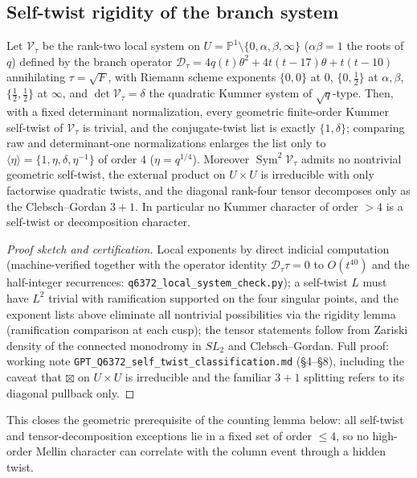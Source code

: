 \subsection{Self-twist rigidity of the branch system}

\begin{theorem}\label{thm:self-twist}
Let $\mathcal V_\tau$ be the rank-two local system on
$U=\mathbb P^1\setminus\{0,\alpha,\beta,\infty\}$ ($\alpha\beta=1$ the roots
of $q$) defined by the branch operator
$\mathcal D_\tau=4q(t)\theta^2+4t(t-17)\theta+t(t-10)$ annihilating
$\tau=\sqrt F$, with Riemann scheme exponents $\{0,0\}$ at $0$,
$\{0,\tfrac12\}$ at $\alpha,\beta$, $\{\tfrac12,\tfrac12\}$ at $\infty$, and
$\det\mathcal V_\tau=\delta$ the quadratic Kummer system of $\sqrt{q}$-type.
Then, with a fixed determinant normalization, every geometric finite-order
Kummer self-twist of $\mathcal V_\tau$ is trivial, and the conjugate-twist
list is exactly $\{1,\delta\}$; comparing raw and determinant-one
normalizations enlarges the list only to
$\langle\eta\rangle=\{1,\eta,\delta,\eta^{-1}\}$ of order $4$
($\eta=q^{1/4}$).  Moreover $\operatorname{Sym}^2\mathcal V_\tau$ admits no
nontrivial geometric self-twist, the external product on $U\times U$ is
irreducible with only factorwise quadratic twists, and the diagonal rank-four
tensor decomposes only as the Clebsch--Gordan $3+1$.  In particular no Kummer
character of order $>4$ is a self-twist or decomposition character.
\end{theorem}

\begin{proof}[Proof sketch and certification]
Local exponents by direct indicial computation (machine-verified together
with the operator identity $\mathcal D_\tau\tau=0$ to $O(t^{40})$ and the
half-integer recurrences: \texttt{q6372\_local\_system\_check.py}); a
self-twist $L$ must have $L^2$ trivial with ramification supported on the
four singular points, and the exponent lists above eliminate all nontrivial
possibilities via the rigidity lemma (ramification comparison at each cusp);
the tensor statements follow from Zariski density of the connected monodromy
in $SL_2$ and Clebsch--Gordan.  Full proof: working note
\texttt{GPT\_Q6372\_self\_twist\_classification.md} (\S4--\S8), including the
caveat that $\boxtimes$ on $U\times U$ is irreducible and the familiar $3+1$
splitting refers to its diagonal pullback only.
\end{proof}

\noindent This closes the geometric prerequisite of the counting lemma
below: all self-twist and tensor-decomposition exceptions lie in a fixed set
of order $\le4$, so no high-order Mellin character can correlate with the
column event through a hidden twist.

